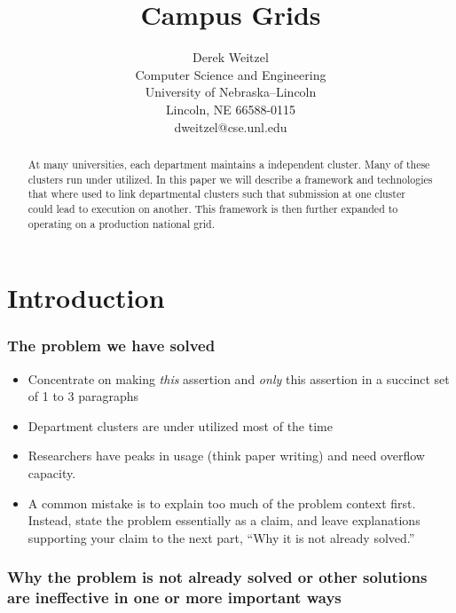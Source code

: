 \documentclass[11pt]{article}
\title{\bf Campus Grids}
\author{Derek Weitzel\\
Computer Science and Engineering\\
University of Nebraska--Lincoln\\
Lincoln, NE 66588-0115\\
dweitzel@cse.unl.edu
       }
\newcommand{\doublespace}{\baselineskip0.34truein}
\begin{document}
\maketitle

\begin{abstract}

At many universities, each department maintains a independent cluster.  Many of these clusters run under utilized.  In this paper we will describe a framework and technologies that where used to link departmental clusters such that submission at one cluster could lead to execution on another.  This framework is then further expanded to operating on a production national grid.

\end{abstract}



\section{Introduction}
\label{sec:Introduction}

\subsubsection* {The problem we have solved}

\begin{itemize}
\item
Concentrate on making {\em this} assertion and {\em only} this assertion in a
succinct set of 1 to 3 paragraphs 

\item Department clusters are under utilized most of the time
\item Researchers have peaks in usage (think paper writing) and need overflow capacity.

\item
A common mistake is to explain too much of the problem context first. Instead,
state the problem essentially as a claim, and leave explanations supporting
your claim to the next part, ``Why it is not already solved.''

\end{itemize}


\subsubsection* {Why the problem is not already solved or other solutions 
are ineffective in one or more important ways}
\end{document}
